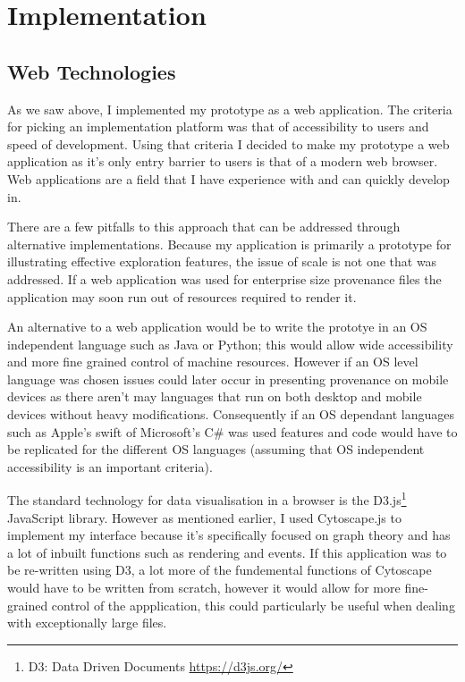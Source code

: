 \section{Implementation}

\subsection{Web Technologies}
\label{sec:web_technologies}

As we saw above, I implemented my prototype as a web application. The criteria for picking an implementation platform was that of accessibility to users and speed of development. Using that criteria I decided to make my prototype a web application as it's only entry barrier to users is that of a modern web browser. Web applications are a field that I have experience with and can quickly develop in. 

There are a few pitfalls to this approach that can be addressed through alternative implementations. Because my application is primarily a prototype for illustrating effective exploration features, the issue of scale is not one that was addressed. If a web application was used for enterprise size provenance files the application may soon run out of resources required to render it.

An alternative to a web application would be to write the prototye in an OS independent language such as Java or Python; this would allow wide accessibility and more fine grained control of machine resources. However if an OS level language was chosen issues could later occur in presenting provenance on mobile devices as there aren't may languages that run on both desktop and mobile devices without heavy modifications. Consequently if an OS dependant languages such as Apple's swift of Microsoft's C\# was used features and code would have to be replicated for the different OS languages (assuming that OS independent accessibility is an important criteria).

The standard technology for data visualisation in a browser is the D3.js\footnote{D3: Data Driven Documents \url{https://d3js.org/}} JavaScript library. However as mentioned earlier, I used Cytoscape.js to implement my interface because it's specifically focused on graph theory and has a lot of inbuilt functions such as rendering and events. If this application was to be re-written using D3, a lot more of the fundemental functions of Cytoscape would have to be written from scratch, however it would allow for more fine-grained control of the appplication, this could particularly be useful when dealing with exceptionally large files.

